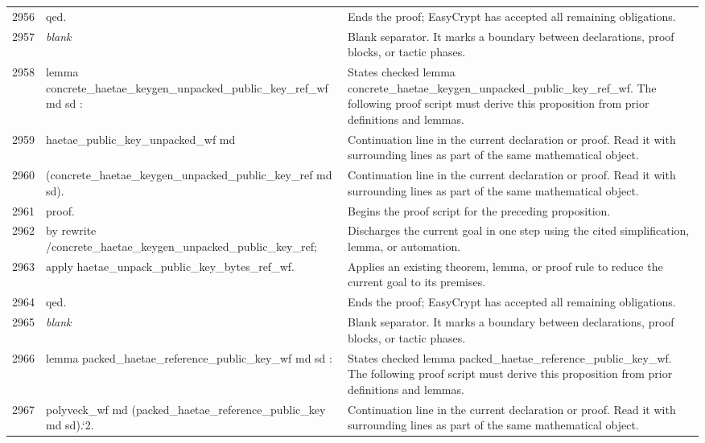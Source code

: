 \documentclass[10pt]{article}
\begin{document}
\begin{longtable}{r L{0.53\textwidth} L{0.37\textwidth}}
2956 & {\ttfamily\scriptsize qed.} & Ends the proof; EasyCrypt has accepted all remaining obligations. \\
2957 & {\ttfamily\scriptsize \emph{blank}} & Blank separator.  It marks a boundary between declarations, proof blocks, or tactic phases. \\
2958 & {\ttfamily\scriptsize lemma concrete\_haetae\_keygen\_unpacked\_public\_key\_ref\_wf md sd :} & States checked lemma concrete\_haetae\_keygen\_unpacked\_public\_key\_ref\_wf.  The following proof script must derive this proposition from prior definitions and lemmas. \\
2959 & {\ttfamily\scriptsize   haetae\_public\_key\_unpacked\_wf md} & Continuation line in the current declaration or proof.  Read it with surrounding lines as part of the same mathematical object. \\
2960 & {\ttfamily\scriptsize     (concrete\_haetae\_keygen\_unpacked\_public\_key\_ref md sd).} & Continuation line in the current declaration or proof.  Read it with surrounding lines as part of the same mathematical object. \\
2961 & {\ttfamily\scriptsize proof.} & Begins the proof script for the preceding proposition. \\
2962 & {\ttfamily\scriptsize by rewrite /concrete\_haetae\_keygen\_unpacked\_public\_key\_ref;} & Discharges the current goal in one step using the cited simplification, lemma, or automation. \\
2963 & {\ttfamily\scriptsize    apply haetae\_unpack\_public\_key\_bytes\_ref\_wf.} & Applies an existing theorem, lemma, or proof rule to reduce the current goal to its premises. \\
2964 & {\ttfamily\scriptsize qed.} & Ends the proof; EasyCrypt has accepted all remaining obligations. \\
2965 & {\ttfamily\scriptsize \emph{blank}} & Blank separator.  It marks a boundary between declarations, proof blocks, or tactic phases. \\
2966 & {\ttfamily\scriptsize lemma packed\_haetae\_reference\_public\_key\_wf md sd :} & States checked lemma packed\_haetae\_reference\_public\_key\_wf.  The following proof script must derive this proposition from prior definitions and lemmas. \\
2967 & {\ttfamily\scriptsize   polyveck\_wf md (packed\_haetae\_reference\_public\_key md sd).`2.} & Continuation line in the current declaration or proof.  Read it with surrounding lines as part of the same mathematical object. \\

\end{longtable}
\end{document}
